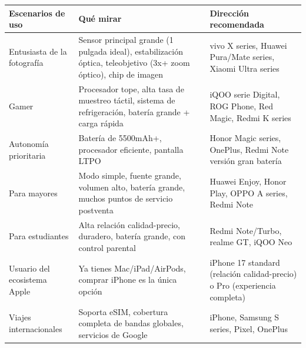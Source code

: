 \begin{center}
\begin{tabularx}{\linewidth}{|X|X|X|}
\hline
\textbf{Escenarios de uso} & \textbf{Qué mirar} & \textbf{Dirección recomendada} \tabularnewline
\hline
Entusiasta de la fotografía & Sensor principal grande (1 pulgada ideal), estabilización óptica, teleobjetivo (3x+ zoom óptico), chip de imagen & vivo X series, Huawei Pura/Mate series, Xiaomi Ultra series \tabularnewline
Gamer & Procesador tope, alta tasa de muestreo táctil, sistema de refrigeración, batería grande + carga rápida & iQOO serie Digital, ROG Phone, Red Magic, Redmi K series \tabularnewline
Autonomía prioritaria & Batería de 5500mAh+, procesador eficiente, pantalla LTPO & Honor Magic series, OnePlus, Redmi Note versión gran batería \tabularnewline
Para mayores & Modo simple, fuente grande, volumen alto, batería grande, muchos puntos de servicio postventa & Huawei Enjoy, Honor Play, OPPO A series, Redmi Note \tabularnewline
Para estudiantes & Alta relación calidad-precio, duradero, batería grande, con control parental & Redmi Note/Turbo, realme GT, iQOO Neo \tabularnewline
Usuario del ecosistema Apple & Ya tienes Mac/iPad/AirPods, comprar iPhone es la única opción & iPhone 17 standard (relación calidad-precio) o Pro (experiencia completa) \tabularnewline
Viajes internacionales & Soporta eSIM, cobertura completa de bandas globales, servicios de Google & iPhone, Samsung S series, Pixel, OnePlus \tabularnewline
\hline
\end{tabularx}
\end{center}


